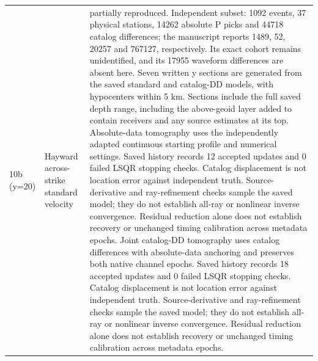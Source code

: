 \begin{longtable}{>{\raggedright\arraybackslash}p{}>{\raggedright\arraybackslash}p{}>{\raggedright\arraybackslash}p{}}
10b (y=20) & Hayward across-strike standard velocity & partially reproduced. Independent subset: 1092 events, 37 physical stations, 14262 absolute P picks and 44718 catalog differences; the manuscript reports 1489, 52, 20257 and 767127, respectively. Its exact cohort remains unidentified, and its 17955 waveform differences are absent here. Seven written y sections are generated from the saved standard and catalog-DD models, with hypocenters within 5 km. Sections include the full saved depth range, including the above-geoid layer added to contain receivers and any source estimates at its top. Absolute-data tomography uses the independently adapted continuous starting profile and numerical settings. Saved history records 12 accepted updates and 0 failed LSQR stopping checks. Catalog displacement is not location error against independent truth. Source-derivative and ray-refinement checks sample the saved model; they do not establish all-ray or nonlinear inverse convergence. Residual reduction alone does not establish recovery or unchanged timing calibration across metadata epochs. Joint catalog-DD tomography uses catalog differences with absolute-data anchoring and preserves both native channel epochs. Saved history records 18 accepted updates and 0 failed LSQR stopping checks. Catalog displacement is not location error against independent truth. Source-derivative and ray-refinement checks sample the saved model; they do not establish all-ray or nonlinear inverse convergence. Residual reduction alone does not establish recovery or unchanged timing calibration across metadata epochs.\\

\end{longtable}
